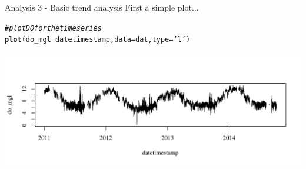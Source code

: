 \documentclass[xcolor=svgnames]{beamer}\usepackage[]{graphicx}\usepackage[]{color}
\makeatletter
\newcommand{\hlstr}[1]{\textcolor[rgb]{0.192,0.494,0.8}{#1}}%
\newcommand{\hlcom}[1]{\textcolor[rgb]{0.678,0.584,0.686}{\textit{#1}}}%
\newcommand{\hlopt}[1]{\textcolor[rgb]{0,0,0}{#1}}%
\newcommand{\hlstd}[1]{\textcolor[rgb]{0.345,0.345,0.345}{#1}}%
\newcommand{\hlkwc}[1]{\textcolor[rgb]{0.333,0.667,0.333}{#1}}%
\newcommand{\hlkwd}[1]{\textcolor[rgb]{0.737,0.353,0.396}{\textbf{#1}}}%
\newenvironment{kframe}{%
 \def\at@end@of@kframe{}%
 \ifinner\ifhmode%
  \def\at@end@of@kframe{\end{minipage}}%
  \begin{minipage}{\columnwidth}%
 \fi\fi%
 \def\FrameCommand##1{\hskip\@totalleftmargin \hskip-\fboxsep
 \colorbox{shadecolor}{##1}\hskip-\fboxsep
     \hskip-\linewidth \hskip-\@totalleftmargin \hskip\columnwidth}%
 \MakeFramed {\advance\hsize-\width
   \@totalleftmargin\z@ \linewidth\hsize
   \@setminipage}}%
 {\par\unskip\endMakeFramed%
 \at@end@of@kframe}
\newenvironment{knitrout}{}{} %
\makeatother
\begin{document}
\begin{frame}[containsverbatim]{Analysis 3 - Basic trend analysis}
First a simple plot...
\begin{knitrout}\scriptsize
{}\color{fgcolor}\begin{kframe}
\begin{alltt}
\hlcom{# plot DO for the time series}
\hlkwd{plot}\hlstd{(do_mgl} \hlopt{~} \hlstd{datetimestamp,} \hlkwc{data} \hlstd{= dat,} \hlkwc{type} \hlstd{=} \hlstr{'l'}\hlstd{)}
\end{alltt}
\end{kframe}

{\centering \includegraphics[width=\textwidth]{figure/unnamed-chunk-14} 

}



\end{knitrout}
\end{frame}
\end{document}
